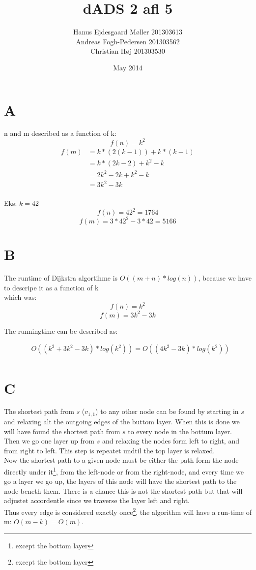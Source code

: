\documentclass{article}
\title{dADS 2 afl 5}
\author{
	Hanus Ejdesgaard Møller 201303613 \\
	Andreas Fogh-Pedersen 201303562 \\
	Christian Høj 201303530
}
\date{May 2014}
\begin{document}
\maketitle

\section*{A}
n and m described as a function of k:
    $$ f(n) = k^2  $$
            \begin{equation*}
            \begin{split}
                f(m) &= k*(2 (k-1))+k*(k-1)\\
                &= k*(2k-2)+k^2-k\\
                &= 2k^2-2k+k^2-k\\
                &= 3k^2-3k\\
            \end{split}
        \end{equation*}
        
Eks: $ k = 42 $
    $$ f(n) = 42^2 = 1764 $$
    $$ f(m) = 3*42^2-3*42 = 5166 $$
    
\section*{B}
The runtime of Dijkstra algortihme is $ O((m+n)*log(n)) $, because we have to descripe it as a function of k\\
which was:
    $$ f(n) = k^2  $$
    $$ f(m) = 3k^2-3k  $$

The runningtime can be described as:

        \begin{equation*}
            \begin{split}
                & O((k^2+3k^2-3k)*log(k^2)) = O((4k^2-3k)*log(k^2))\\
            \end{split}
        \end{equation*}

\section*{C}
The shortest path from $ s $ ($ v_{1,1} $) to any other node can be found by starting in $ s $ and relaxing alt the outgoing edges of the buttom layer. When this is done we will have found the shortest path from $ s $ to every node in the bottum layer.\\
Then we go one layer up from $ s $ and relaxing the nodes form left to right, and from right to left. This step is repeatet undtil the top layer is relaxed.\\
Now the shortest path to a given node must be either the path form the node directly under it\footnote{except the bottom layer}, from the left-node or from the right-node, and every time we go a layer we go up, the layers of this node will have the shortest path to the node beneth them. There is a chance this is not the shortest path but that will adjustet accordentle since we traverse the layer left and right.\\
Thus every edge is considered exactly once\footnote{except the bottom layer}, the algorithm will have a run-time of m: $ O(m-k)=O(m) $.
\end{document}
